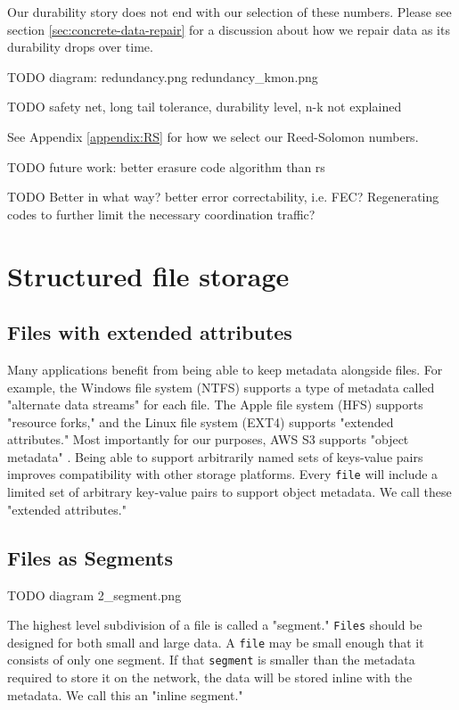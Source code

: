 \documentclass[11pt,fleqn,openany]{book}
\newcommand{\x}[1]{{\tt #1}} \newcommand{\code}[1]{{\em #1}}
\newcommand{\todo}[1]{{\color{red} TODO #1 }}
\begin{document}
Our durability story does not end with our selection of these numbers.
Please see section \ref{sec:concrete-data-repair} for a discussion about
how we repair data as its durability drops over time.

\todo{diagram:
redundancy.png
redundancy\_kmon.png
}

\todo{safety net, long tail tolerance, durability level, n-k not explained}

See Appendix \ref{appendix:RS} for how we select our Reed-Solomon numbers.

\todo{future work: better erasure code algorithm than rs}

\todo{Better in what way? better error correctability, i.e. FEC? Regenerating
codes to further limit the necessary coordination traffic?}

\section{Structured file storage}

\subsection{Files with extended attributes}

Many applications benefit from being able to keep metadata alongside files. For
example, the Windows file system (NTFS) supports a type of metadata called
"alternate data streams" for each file. The Apple file system (HFS) supports
"resource forks," and the Linux file system (EXT4) supports
"extended attributes." Most importantly for
our purposes, AWS S3 supports "object metadata" \cite{s3-object-meta}. Being
able to support arbitrarily named sets of keys-value pairs improves
compatibility with other storage platforms. Every \x{file} will include a
limited set of arbitrary key-value pairs to support object metadata. We call
these "extended attributes."

\subsection{Files as Segments}

\todo{diagram 2\_segment.png}

The highest level subdivision of a file is called a "segment."
\x{Files} should be designed for both small and large data.
A \x{file} may be small enough that it consists of only one segment.
If that \x{segment} is smaller than the metadata required to store it on the
network, the data will be stored inline with the metadata. We call this an
"inline segment."
\end{document}
